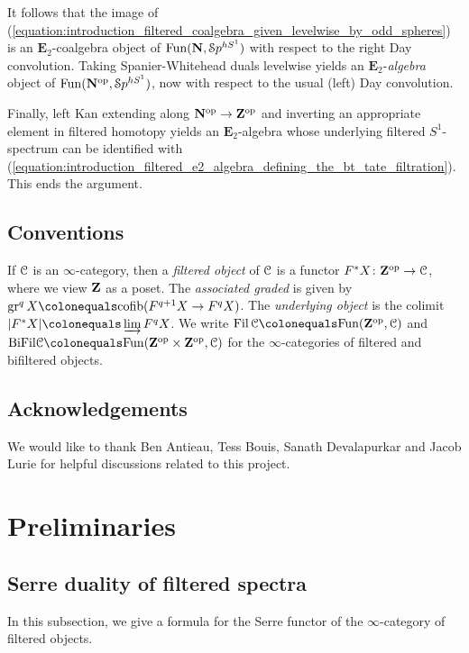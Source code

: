 \documentclass[oneside,a4paper]{amsart}
\begin{document}
It follows that the image of (\ref{equation:introduction_filtered_coalgebra_given_levelwise_by_odd_spheres}) is an $\mathbf{E}_{2}$-coalgebra object of $\mathrm{Fun}(\mathbf{N}, \EuScript{S}p^{hS^{1}})$ with respect to the right Day convolution. Taking Spanier-Whitehead duals levelwise yields an $\mathbf{E}_{2}$-\emph{algebra} object of $\mathrm{Fun}(\mathbf{N}^{\mathrm{op}}, \EuScript{S}p^{hS^{1}})$, now with respect to the usual (left) Day convolution. 

Finally, left Kan extending along $\mathbf{N}^{\mathrm{op}} \rightarrow \mathbf{Z}^{\mathrm{op}}$ and inverting an appropriate element in filtered homotopy yields an $\mathbf{E}_{2}$-algebra whose underlying filtered $S^{1}$-spectrum can be identified with (\ref{equation:introduction_filtered_e2_algebra_defining_the_bt_tate_filtration}). This ends the argument. 

\subsection{Conventions}

If $\EuScript{C}$ is an $\infty$-category, then a \emph{filtered object} of $\EuScript{C}$ is a functor $F^{\ast} X \colon \mathbf{Z}^{\mathrm{op}} \rightarrow \EuScript{C}$, where we view $\mathbf{Z}$ as a poset. The \emph{associated graded} is given by $\gr^{q}X \colonequals \mathrm{cofib}(F^{q+1}X \rightarrow F^{q}X)$. The \emph{underlying object} is the colimit $|F^{\ast} X| \colonequals \varinjlim F^{q} X$. We write $\Fil \ccat \colonequals \Fun(\ZZ^{\op}, \ccat)$ and $\BiFil \ccat \colonequals \Fun(\ZZ^{\op} \times \ZZ^{\op}, \ccat)$ for the $\infty$-categories of filtered and bifiltered objects. 

\subsection{Acknowledgements}

We would like to thank Ben Antieau, Tess Bouis, Sanath Devalapurkar and Jacob Lurie for helpful discussions related to this project. 

\section{Preliminaries} 

\subsection{Serre duality of filtered spectra}

In this subsection, we give a formula for the Serre functor of the $\infty$-category of filtered objects. 
\end{document}
